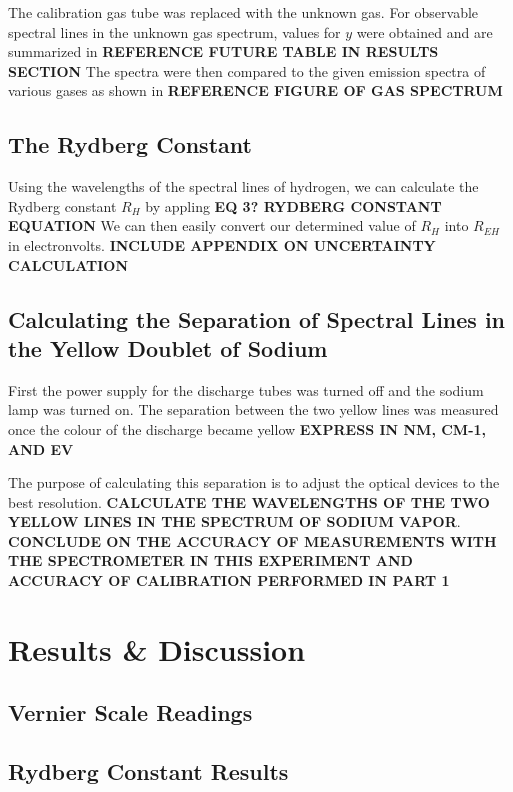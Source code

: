 \documentclass{article} %
\begin{document}
\begin{multicols}{2}
The calibration gas tube was replaced with the unknown gas.
For observable spectral lines in the unknown gas spectrum, values for $y$ were obtained and are summarized in \textbf{REFERENCE FUTURE TABLE IN RESULTS SECTION}
The spectra were then compared to the given emission spectra of various gases as shown in \textbf{REFERENCE FIGURE OF GAS SPECTRUM}

\subsection{The Rydberg Constant}

Using the wavelengths of the spectral lines of hydrogen, we can calculate the Rydberg constant $R_H$ by appling \textbf{EQ 3? RYDBERG CONSTANT EQUATION}
We can then easily convert our determined value of $R_H$ into $R_{EH}$ in electronvolts.
\textbf{INCLUDE APPENDIX ON UNCERTAINTY CALCULATION}

\subsection{Calculating the Separation of Spectral Lines in the Yellow Doublet of Sodium}

First the power supply for the discharge tubes was turned off and the sodium lamp was turned on.
The separation between the two yellow lines was measured once the colour of the discharge became yellow \textbf{EXPRESS IN NM, CM-1, AND EV}

The purpose of calculating this separation is to adjust the optical devices to the best resolution.
\textbf{CALCULATE THE WAVELENGTHS OF THE TWO YELLOW LINES IN THE SPECTRUM OF SODIUM VAPOR}.
\textbf{CONCLUDE ON THE ACCURACY OF MEASUREMENTS WITH THE SPECTROMETER IN THIS EXPERIMENT AND ACCURACY OF CALIBRATION PERFORMED IN PART 1}

\section{Results \& Discussion}

\subsection{Vernier Scale Readings}

\subsection{Rydberg Constant Results}


\end{multicols}
\end{document}
